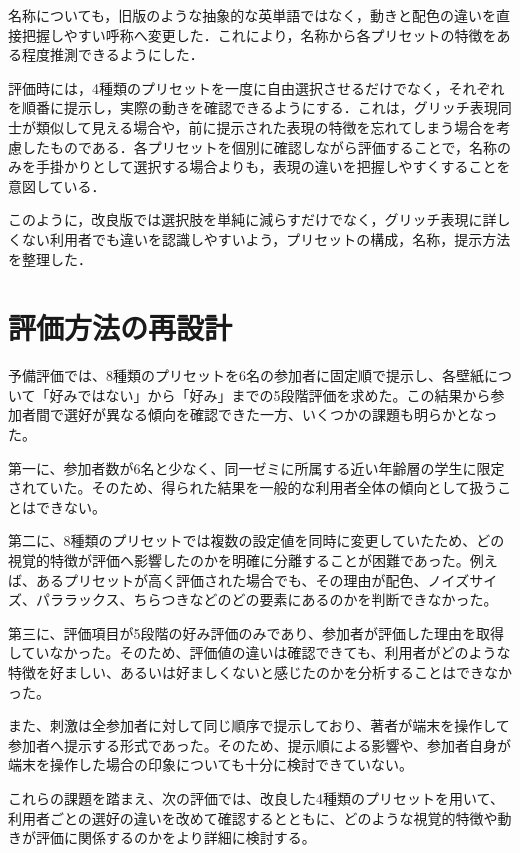 名称についても，旧版のような抽象的な英単語ではなく，動きと配色の違いを直接把握しやすい呼称へ変更した．これにより，名称から各プリセットの特徴をある程度推測できるようにした．

評価時には，4種類のプリセットを一度に自由選択させるだけでなく，それぞれを順番に提示し，実際の動きを確認できるようにする．これは，グリッチ表現同士が類似して見える場合や，前に提示された表現の特徴を忘れてしまう場合を考慮したものである．各プリセットを個別に確認しながら評価することで，名称のみを手掛かりとして選択する場合よりも，表現の違いを把握しやすくすることを意図している．

このように，改良版では選択肢を単純に減らすだけでなく，グリッチ表現に詳しくない利用者でも違いを認識しやすいよう，プリセットの構成，名称，提示方法を整理した．

\section{評価方法の再設計}

予備評価では、8種類のプリセットを6名の参加者に固定順で提示し、各壁紙について「好みではない」から「好み」までの5段階評価を求めた。この結果から参加者間で選好が異なる傾向を確認できた一方、いくつかの課題も明らかとなった。

第一に、参加者数が6名と少なく、同一ゼミに所属する近い年齢層の学生に限定されていた。そのため、得られた結果を一般的な利用者全体の傾向として扱うことはできない。

第二に、8種類のプリセットでは複数の設定値を同時に変更していたため、どの視覚的特徴が評価へ影響したのかを明確に分離することが困難であった。例えば、あるプリセットが高く評価された場合でも、その理由が配色、ノイズサイズ、パララックス、ちらつきなどのどの要素にあるのかを判断できなかった。

第三に、評価項目が5段階の好み評価のみであり、参加者が評価した理由を取得していなかった。そのため、評価値の違いは確認できても、利用者がどのような特徴を好ましい、あるいは好ましくないと感じたのかを分析することはできなかった。

また、刺激は全参加者に対して同じ順序で提示しており、著者が端末を操作して参加者へ提示する形式であった。そのため、提示順による影響や、参加者自身が端末を操作した場合の印象についても十分に検討できていない。

これらの課題を踏まえ、次の評価では、改良した4種類のプリセットを用いて、利用者ごとの選好の違いを改めて確認するとともに、どのような視覚的特徴や動きが評価に関係するのかをより詳細に検討する。
